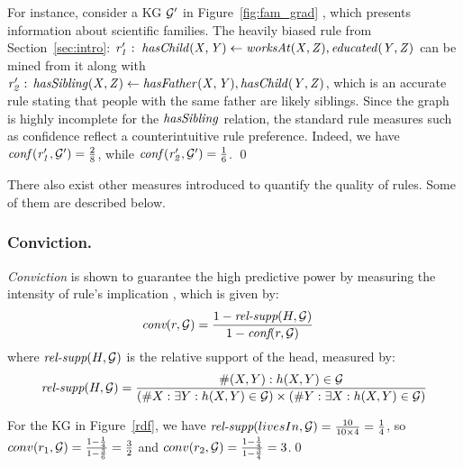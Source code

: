 \begin{example}\label{ex:rulesforgprime}
For instance, consider a KG $\mathcal{G}'$ in Figure~\ref{fig:fam_grad} \cite{carl}, which presents information about scientific families. 
The heavily biased rule from Section~\ref{sec:intro}: $\mathit{r_1':\;hasChild(X,Y)\leftarrow worksAt(X,Z), educated(Y,Z)}$ can be mined from it along with $\mathit{r_2':\,hasSibling(X,Z)\leftarrow hasFather(X,Y),hasChild(Y,Z)}$, which is an accurate rule stating that people with the same father are likely siblings. Since the graph is highly incomplete for the $\mathit{hasSibling}$ relation, the standard rule measures such as confidence reflect a counterintuitive rule preference. Indeed, we have $\mathit{conf(\mathit{r_1',\mathcal{G}'})}=\frac{2}{8}$, while
$\mathit{conf(\mathit{r_2',\mathcal{G}'})}=\frac{1}{6}$. \qed
\end{example}

 There also exist other measures introduced to quantify the quality of rules. Some of them are described below. 
 

\subsubsection{Conviction.} \textit{Conviction} is shown to guarantee the high predictive power \cite{Azevedo2007} by measuring the intensity of rule's implication \cite{metrics-summary}, which is given by:
\begin{align*}
\textit{conv}(r,\mathcal{G}) & = \frac{1 - \textit{rel-supp}(H, \mathcal{G})}{1-\textit{conf}(r,\mathcal{G})}
\end{align*}
where $\textit{rel-supp}(H, \mathcal{G})$ is the relative support of the head, measured by:
\begin{align*}
\textit{rel-supp}(H, \mathcal{G}) = \dfrac{\#(X,Y):h(X,Y)\in \mathcal{G}}{(\#X:\exists Y:h(X,Y)\in \mathcal{G})\times(\#Y:\exists X:h(X,Y)\in \mathcal{G})}
\end{align*}
\begin{example}
For the KG in Figure~\ref{rdf}, we have $\textit{rel-supp}(livesIn, \mathcal{G}) = \frac{10}{10 \times 4} = \frac{1}{4}$, so $conv(r_1,\mathcal{G}) = \frac{1-\frac{1}{4}}{1-\frac{3}{6}} = \frac{3}{2}$ and $conv(r_2,\mathcal{G}) = \frac{1-\frac{1}{4}}{1-\frac{3}{4}} = 3$.\qed
\end{example}

